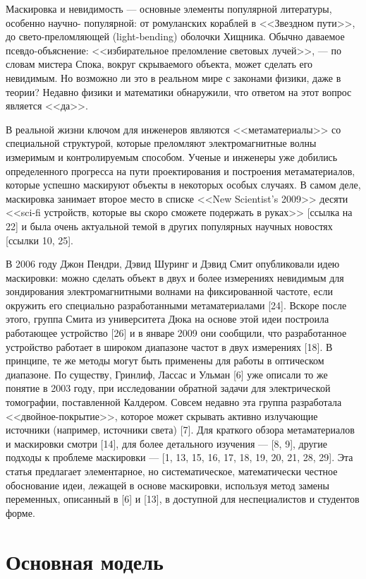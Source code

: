 \documentclass[a4paper, 12pt]{article}
\begin{document}
Маскировка и невидимость --- основные элементы популярной литературы, особенно научно-
популярной: от
ромуланских кораблей в <<Звездном пути>>, до свето-преломляющей (light-bending) 
оболочки Хищника. Обычно
даваемое псевдо-объяснение: <<избирательное преломление световых лучей>>, --- по 
словам мистера Спока,
вокруг скрываемого объекта, может сделать его невидимым. Но возможно ли это в реальном 
мире с законами
физики, даже в теории? Недавно физики и математики обнаружили, что ответом на этот 
вопрос является
<<да>>.


В реальной жизни ключом для инженеров являются <<метаматериалы>> со специальной 
структурой, которые
преломляют электромагнитные волны измеримым и контролируемым способом. Ученые и 
инженеры уже добились
определенного прогресса на пути проектирования и построения метаматериалов, которые 
успешно маскируют
объекты в некоторых особых случаях. В самом деле, маскировка занимает второе место в 
списке <<New
Scientist's 2009>> десяти <<sci-fi устройств, которые вы скоро сможете подержать в 
руках>> [ссылка на 22] и
была очень актуальной темой в других популярных научных новостях [ссылки 10, 25].


В 2006 году Джон Пендри, Дэвид Шуринг и Дэвид Смит опубликовали идею маскировки: можно 
сделать объект в двух
и более измерениях невидимым для зондирования электромагнитными волнами на 
фиксированной частоте, если
окружить его специально разработанными метаматериалами [24]. Вскоре после этого, 
группа Смита из
университета Дюка на основе этой идеи построила работающее устройство [26] и в январе 
2009 они сообщили, что
разработанное устройство работает в широком диапазоне частот в двух измерениях [18]. В 
принципе, те же
методы могут быть применены для работы в оптическом диапазоне. По существу, Гринлиф, 
Лассас и Ульман [6] уже
описали то же понятие в 2003 году, при исследовании обратной задачи для электрической 
томографии,
поставленной Калдером. Совсем недавно эта группа разработала <<двойное-покрытие>>, 
которое может скрывать
активно излучающие источники (например, источники света) [7]. Для краткого обзора 
метаматериалов и
маскировки смотри [14], для более детального изучения --- [8, 9], другие подходы к 
проблеме маскировки ---
[1, 13, 15, 16, 17, 18, 19, 20, 21, 28, 29]. Эта статья предлагает элементарное, но 
систематическое,
математически честное обоснование идеи, лежащей в основе маскировки, используя метод 
замены переменных,
описанный в [6] и [13], в доступной для неспециалистов и студентов форме.

\section{Основная модель}
\end{document}
